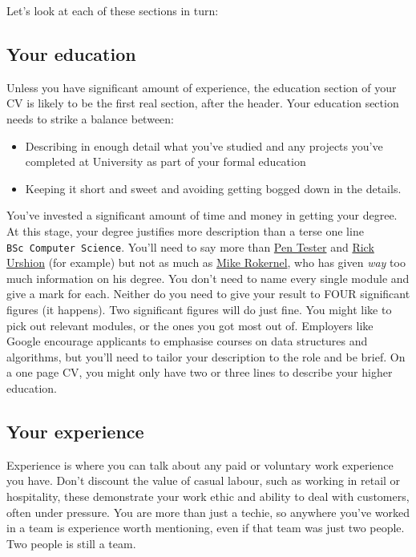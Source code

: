 \documentclass[
]{book}
\providecommand{\tightlist}{%
  \setlength{\itemsep}{0pt}\setlength{\parskip}{0pt}}
\begin{document}
Let's look at each of these sections in turn:

\hypertarget{mycved}{%
\subsection{Your education}\label{mycved}}

Unless you have significant amount of experience, the education section of your CV is likely to be the first real section, after the header. Your education section needs to strike a balance between:

\begin{itemize}
\tightlist
\item
  Describing in enough detail what you've studied and any projects you've completed at University as part of your formal education
\item
  Keeping it short and sweet and avoiding getting bogged down in the details.
\end{itemize}

You've invested a significant amount of time and money in getting your degree. At this stage, your degree justifies more description than a terse one line \texttt{BSc\ Computer\ Science}. You'll need to say more than \href{Penelope_Tester.pdf}{Pen Tester} and \href{Rick_Urshion.pdf}{Rick Urshion} (for example) but not as much as \href{Mike_Rokernel.pdf}{Mike Rokernel}, who has given \emph{way} too much information on his degree. You don't need to name every single module and give a mark for each. Neither do you need to give your result to FOUR significant figures (it happens). Two significant figures will do just fine. You might like to pick out relevant modules, or the ones you got most out of. Employers like Google encourage applicants to emphasise courses on data structures and algorithms, but you'll need to tailor your description to the role and be brief. On a one page CV, you might only have two or three lines to describe your higher education.

\hypertarget{mycvex}{%
\subsection{Your experience}\label{mycvex}}

Experience is where you can talk about any paid or voluntary work experience you have. Don't discount the value of casual labour, such as working in retail or hospitality, these demonstrate your work ethic and ability to deal with customers, often under pressure. You are more than just a techie, so anywhere you've worked in a team is experience worth mentioning, even if that team was just two people. Two people is still a team.
\end{document}
